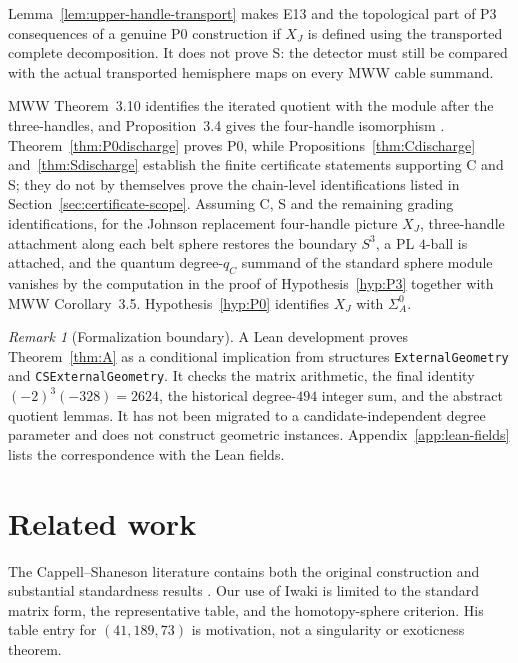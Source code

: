 \documentclass[11pt]{amsart}
\theoremstyle{definition}
\theoremstyle{remark}
\newtheorem{remark}[theorem]{Remark}
\begin{document}
Lemma~\ref{lem:upper-handle-transport} makes E13 and the topological part of
P3 consequences of a genuine P0 construction if $X_J$ is defined using the
transported complete decomposition.  It does not prove S: the detector must
still be compared with the actual transported hemisphere maps on every MWW
cable summand.

MWW Theorem~3.10 identifies the iterated quotient with the module after the
three-handles, and Proposition~3.4 gives the four-handle isomorphism
\cite{ManolescuWalkerWedrich2023}.  Theorem~\ref{thm:P0discharge} proves P0,
while Propositions~\ref{thm:Cdischarge} and~\ref{thm:Sdischarge} establish the
finite certificate statements supporting C and S; they do not by themselves
prove the chain-level identifications listed in
Section~\ref{sec:certificate-scope}.  Assuming C, S and the remaining grading
identifications,
for the Johnson
replacement four-handle picture $X_J$, three-handle attachment along each
belt sphere restores the boundary $S^3$, a PL $4$-ball is attached, and the
quantum degree-$q_C$ summand of the standard sphere module vanishes by the
computation in the proof of Hypothesis~\ref{hyp:P3} together with MWW
Corollary~3.5.  Hypothesis~\ref{hyp:P0} identifies $X_J$ with $\Sigma_A^0$.

\begin{remark}[Formalization boundary]\label{rem:lean-boundary}
A Lean development \cite{Lean4} proves Theorem~\ref{thm:A} as a conditional
implication from structures \texttt{ExternalGeometry} and
\texttt{CSExternalGeometry}.  It checks the matrix arithmetic, the final
identity $(-2)^3(-328)=2624$, the historical degree-$494$ integer sum, and the
abstract quotient lemmas.  It has not been migrated to a
candidate-independent degree parameter and does not
construct geometric instances.  Appendix~\ref{app:lean-fields}
lists the correspondence with the Lean fields.
\end{remark}



\section{Related work}

The Cappell--Shaneson literature contains both the original construction
\cite{CappellShaneson1976,AitchisonRubinstein1984} and substantial
standardness results
\cite{Akbulut2010,Gompf2010,KimYamada2017,Iwaki2024}.  Our use of Iwaki is
limited to the standard matrix form, the representative table, and the
homotopy-sphere criterion.  His table entry for $(41,189,73)$ is motivation,
not a singularity or exoticness theorem.
\end{document}

